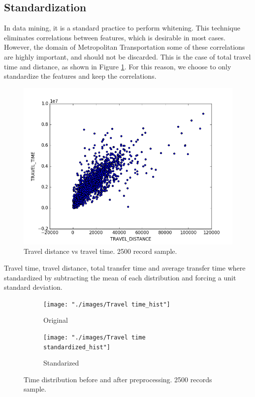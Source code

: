 \documentclass{article}
\begin{document}
\subsection{Standardization} 
In data mining, it is a standard practice to perform whitening. This technique eliminates correlations between features, which is desirable in most cases. However, the domain of Metropolitan Transportation some of these correlations are highly important, and should not be discarded. This is the case of total travel time and distance, as shown in Figure \ref{fig:preprocessing/distance_time_correlation}. For this reason, we choose to only standardize the features and keep the correlations. 

\begin{figure}[H]
  \centering
  \includegraphics[width=.8\linewidth]{./images/distance_vs_time.png}
  \caption{Travel distance vs travel time. 2500 record sample.}
  \label{fig:preprocessing/distance_time_correlation}
\end{figure}

Travel time, travel distance, total transfer time and average transfer time where standardized by subtracting the mean of each distribution and forcing a unit standard deviation.

\begin{figure}[H]
  \centering
  \begin{subfigure}[b]{.45\textwidth}
  	\centering
  	\texttt{[image: "./images/Travel time\_hist"]}
  	\caption{Original}
  \end{subfigure}
  \begin{subfigure}[b]{.45\textwidth}
  	\centering
  	\texttt{[image: "./images/Travel time standardized\_hist"]}
  	\caption{Standarized}
  \end{subfigure}
  \caption{Time distribution before and after preprocessing. 2500 records sample.}
  	\label{fig:preprocessing/time}
\end{figure}
\end{document}
